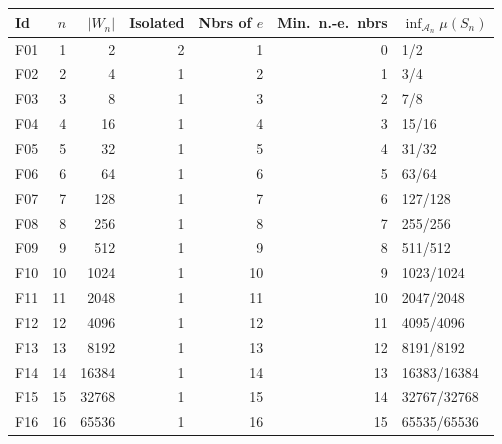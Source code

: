 {\small
\begin{longtable}{@{}lrrrrrl@{}}
\toprule
Id & $n$ & $|W_n|$ & Isolated & Nbrs of $e$ & Min.\ n.-e.\ nbrs & $\inf_{\mathcal{A}_n}\mu(S_n)$ \\
\midrule\endhead
\bottomrule\endfoot
F01 & 1 & 2 & 2 & 1 & 0 & 1/2 \\
F02 & 2 & 4 & 1 & 2 & 1 & 3/4 \\
F03 & 3 & 8 & 1 & 3 & 2 & 7/8 \\
F04 & 4 & 16 & 1 & 4 & 3 & 15/16 \\
F05 & 5 & 32 & 1 & 5 & 4 & 31/32 \\
F06 & 6 & 64 & 1 & 6 & 5 & 63/64 \\
F07 & 7 & 128 & 1 & 7 & 6 & 127/128 \\
F08 & 8 & 256 & 1 & 8 & 7 & 255/256 \\
F09 & 9 & 512 & 1 & 9 & 8 & 511/512 \\
F10 & 10 & 1024 & 1 & 10 & 9 & 1023/1024 \\
F11 & 11 & 2048 & 1 & 11 & 10 & 2047/2048 \\
F12 & 12 & 4096 & 1 & 12 & 11 & 4095/4096 \\
F13 & 13 & 8192 & 1 & 13 & 12 & 8191/8192 \\
F14 & 14 & 16384 & 1 & 14 & 13 & 16383/16384 \\
F15 & 15 & 32768 & 1 & 15 & 14 & 32767/32768 \\
F16 & 16 & 65536 & 1 & 16 & 15 & 65535/65536 \\
\end{longtable}}

